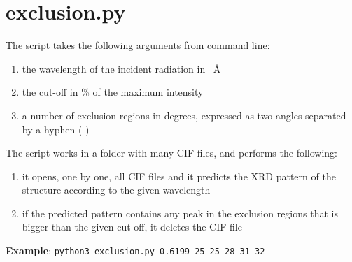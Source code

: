 \documentclass{article}
\begin{document}
\section{exclusion.py}
The script takes the following arguments from command line:
\begin{enumerate}
	\item the wavelength of the incident radiation in \SI{}{\angstrom}
	\item the cut-off in \% of the maximum intensity
	\item a number of exclusion regions in degrees, expressed as two angles separated by a hyphen (-)
\end{enumerate}
The script works in a folder with many CIF files, and performs the following:
\begin{enumerate}
	\item it opens, one by one, all CIF files and it predicts the XRD pattern of the structure according to the given wavelength
	\item if the predicted pattern contains any peak in the exclusion regions that is bigger than the given cut-off, it deletes the CIF file
\end{enumerate}
\textbf{Example}: \texttt{python3 exclusion.py 0.6199 25 25-28 31-32}

\vspace{1cm}
\end{document}

